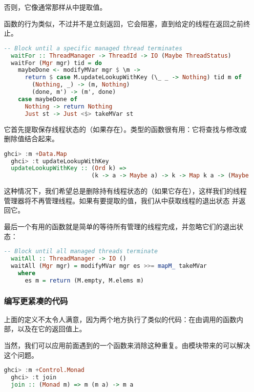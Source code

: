 \documentclass[./main.tex]{subfiles}
\begin{document}
否则，它像通常那样从中提取值。

函数的行为类似，不过并不是立刻返回，它会阻塞，直到给定的线程在返回之前终止。

\begin{lstlisting}[language=Haskell]
  -- Block until a specific managed thread terminates
  waitFor :: ThreadManager -> ThreadId -> IO (Maybe ThreadStatus)
  waitFor (Mgr mgr) tid = do
    maybeDone <- modifyMVar mgr $ \m ->
      return $ case M.updateLookupWithKey (\_ _ -> Nothing) tid m of
        (Nothing, _) -> (m, Nothing)
        (done, m') -> (m', done)
    case maybeDone of
      Nothing -> return Nothing
      Just st -> Just <$> takeMVar st
\end{lstlisting}

它首先提取保存线程状态的（如果存在）。类型的函数很有用：它将查找与修改或删除值结合起来。

\begin{lstlisting}[language=Haskell]
  ghci> :m +Data.Map
  ghci> :t updateLookupWithKey
  updateLookupWithKey :: (Ord k) =>
                         (k -> a -> Maybe a) -> k -> Map k a -> (Maybe a, Map k a)
\end{lstlisting}

这种情况下，我们希望总是删除持有线程状态的（如果它存在），这样我们的线程管理器将不再管理线程。如果有要提取的值，我们从中获取线程的退出状态
并返回它。

最后一个有用的函数就是简单的等待所有管理的线程完成，并忽略它们的退出状态：

\begin{lstlisting}[language=Haskell]
  -- Block until all managed threads terminate
  waitAll :: ThreadManager -> IO ()
  waitAll (Mgr mgr) = modifyMVar mgr es >>= mapM_ takeMVar
    where
      es m = return (M.empty, M.elems m)
\end{lstlisting}

\subsubsection*{编写更紧凑的代码}

上面的定义不太令人满意，因为两个地方执行了类似的代码：在由调用的函数内部，以及在它的返回值上。

当然，我们可以应用前面遇到的一个函数来消除这种重复。由模块带来的可以解决这个问题。

\begin{lstlisting}[language=Haskell]
  ghci> :m +Control.Monad
  ghci> :t join
  join :: (Monad m) => m (m a) -> m a
\end{lstlisting}
\end{document}
